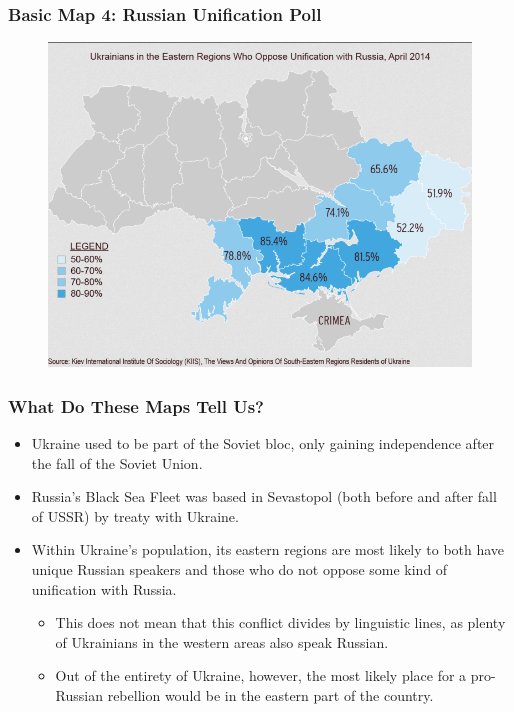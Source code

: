 \documentclass{beamer}
\begin{document}
\begin{frame} 
	\frametitle{\LARGE{Basic Map 4: Russian Unification Poll}}
	\begin{figure}[ht!]
		\centering
		\includegraphics[width=\textwidth,height=0.9\textheight,keepaspectratio]{map4.png}
	\end{figure}
\end{frame}

\begin{frame} 
	\frametitle{\LARGE{What Do These Maps Tell Us?}}
	\begin{itemize}
		\item Ukraine used to be part of the Soviet bloc, only gaining independence after the fall of the Soviet Union. \pause
		\item Russia's Black Sea Fleet was based in Sevastopol (both before and after fall of USSR) by treaty with Ukraine. \pause
		\item Within Ukraine's population, its eastern regions are most likely to both have unique Russian speakers and those who do not oppose some kind of unification with Russia. \pause
		\begin{itemize}
			\item This does not mean that this conflict divides by linguistic lines, as plenty of Ukrainians in the western areas also speak Russian. \pause
			\item Out of the entirety of Ukraine, however, the most likely place for a pro-Russian rebellion would be in the eastern part of the country.
		\end{itemize}
	\end{itemize}
\end{frame}
\end{document}
